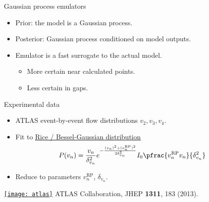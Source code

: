 \documentclass{beamer}
\begin{document}
\begin{frame}[label=emu]{Gaussian process emulators}
  \begin{itemize}
    \item Prior:  the model is a Gaussian process.
    \item Posterior:  Gaussian process conditioned on model outputs.
  \end{itemize}


  \hspace{-5mm}
  

  \begin{itemize}
    \item Emulator is a fast surrogate to the actual model.
      \begin{itemize}
        \item More certain near calculated points.
        \item Less certain in gaps.
      \end{itemize}
  \end{itemize}
\end{frame}




\begin{frame}[label=atlas]{Experimental data}
  \begin{itemize}
    \item ATLAS event-by-event flow distributions $v_2,v_3,v_4$.
    \item Fit to \hyperlink{rice}{Rice / Bessel-Gaussian distribution}
      \begin{equation*}
        P(v_n) = \frac{v_n}{\delta_{v_n}^2} e^{ -\frac{(v_n)^2 + (v_n^\text{RP})^2}{2\delta_{v_n}^2} }
        I_0 \pfrac{v_n^\text{RP}v_n}{\delta_{v_n}^2}
      \end{equation*}
    \item Reduce to parameters $v_n^\text{RP}$, $\delta_{v_n}$.
  \end{itemize}
  


  \centering
  \hyperlink{unfold}{\texttt{[image: atlas]}}
  \flushright\vspace{-2ex} \tiny ATLAS Collaboration, JHEP {\bf 1311}, 183 (2013).
\end{frame}
\end{document}
